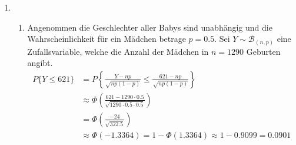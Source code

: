 \documentclass[a4paper]{scrartcl}
\begin{document}
\begin{enumerate}[label=\bfseries\arabic*.]
    \item
        \begin{enumerate}[label=(\alph*)]
            \item
                Angenommen die Geschlechter aller Babys sind unabhängig und die
                Wahrscheinlichkeit für ein Mädchen betrage $p = \num{0,5}$.
                Sei $Y \sim \mathcal{B}_{(n, p)}$ eine Zufallsvariable, welche
                die Anzahl der Mädchen in $n = 1290$ Geburten angibt.
                \begin{equation*}
                    \begin{split}
                        P\{Y \leq 621\}
                        &= P\left\{ \frac{Y - np}{\sqrt{np(1-p)}} \leq
                            \frac{621 - np}{\sqrt{np(1-p)}} \right\} \\
                        &\approx \Phi\left(
                            \frac{621 - 1290 \cdot \num{0,5}}
                            {\sqrt{1290 \cdot \num{0,5} \cdot \num{0,5}}}
                        \right) \\
                        &= \Phi\left( \frac{-24}{\sqrt{\num{322,5}}} \right) \\
                        &\approx \Phi(\num{-1,3364})
                        = 1 - \Phi(\num{1,3364})
                        \approx 1 - \num{0,9099}
                        = \num{0,0901}
                    \end{split}
                \end{equation*}



\end{enumerate}
\end{enumerate}
\end{document}
